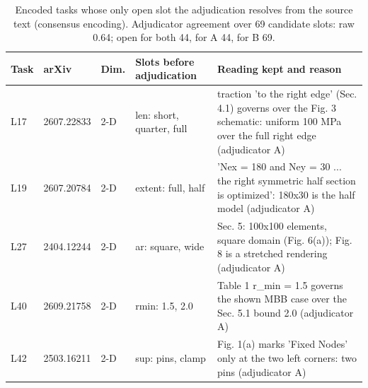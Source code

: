 \begin{table}[t]
\centering\small
\caption{Encoded tasks whose only open slot the adjudication resolves from the source text (consensus encoding). Adjudicator agreement over 69 candidate slots: raw 0.64; open for both 44, for A 44, for B 69.}
\label{tab:tab_resolved}
\begin{tabular}{lllp{4cm}p{6cm}}
\toprule
Task & arXiv & Dim. & Slots before adjudication & Reading kept and reason \\
\midrule
L17 & 2607.22833 & 2-D & len: short, quarter, full & traction 'to the right edge' (Sec. 4.1) governs over the Fig. 3 schematic: uniform 100 MPa over the full right edge (adjudicator A) \\
L19 & 2607.20784 & 2-D & extent: full, half & 'Nex = 180 and Ney = 30 ... the right symmetric half section is optimized': 180x30 is the half model (adjudicator A) \\
L27 & 2404.12244 & 2-D & ar: square, wide & Sec. 5: 100x100 elements, square domain (Fig. 6(a)); Fig. 8 is a stretched rendering (adjudicator A) \\
L40 & 2609.21758 & 2-D & rmin: 1.5, 2.0 & Table 1 r\_min = 1.5 governs the shown MBB case over the Sec. 5.1 bound 2.0 (adjudicator A) \\
L42 & 2503.16211 & 2-D & sup: pins, clamp & Fig. 1(a) marks 'Fixed Nodes' only at the two left corners: two pins (adjudicator A) \\
\bottomrule
\end{tabular}
\end{table}

